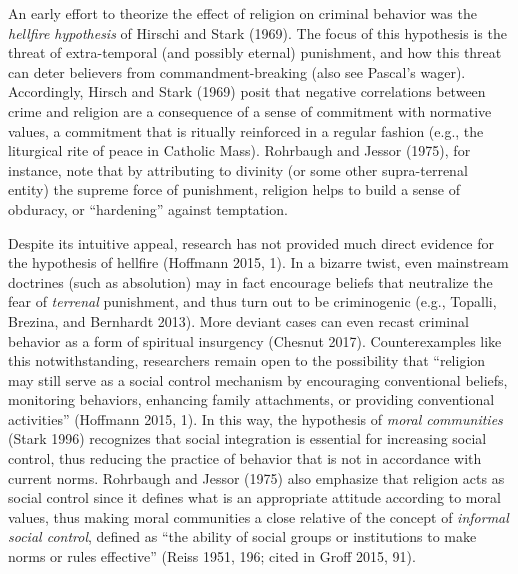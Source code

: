 \documentclass[smallextended]{svjour3}       %
\begin{document}
An early effort to theorize the effect of religion on criminal behavior
was the \emph{hellfire hypothesis} of Hirschi and Stark (1969). The
focus of this hypothesis is the threat of extra-temporal (and possibly
eternal) punishment, and how this threat can deter believers from
commandment-breaking (also see Pascal's wager). Accordingly, Hirsch and
Stark (1969) posit that negative correlations between crime and religion
are a consequence of a sense of commitment with normative values, a
commitment that is ritually reinforced in a regular fashion (e.g., the
liturgical rite of peace in Catholic Mass). Rohrbaugh and Jessor (1975),
for instance, note that by attributing to divinity (or some other
supra-terrenal entity) the supreme force of punishment, religion helps
to build a sense of obduracy, or ``hardening'' against temptation.

Despite its intuitive appeal, research has not provided much direct
evidence for the hypothesis of hellfire (Hoffmann 2015, 1). In a bizarre
twist, even mainstream doctrines (such as absolution) may in fact
encourage beliefs that neutralize the fear of \emph{terrenal}
punishment, and thus turn out to be criminogenic (e.g., Topalli,
Brezina, and Bernhardt 2013). More deviant cases can even recast
criminal behavior as a form of spiritual insurgency (Chesnut 2017).
Counterexamples like this notwithstanding, researchers remain open to
the possibility that ``religion may still serve as a social control
mechanism by encouraging conventional beliefs, monitoring behaviors,
enhancing family attachments, or providing conventional activities''
(Hoffmann 2015, 1). In this way, the hypothesis of \emph{moral
communities} (Stark 1996) recognizes that social integration is
essential for increasing social control, thus reducing the practice of
behavior that is not in accordance with current norms. Rohrbaugh and
Jessor (1975) also emphasize that religion acts as social control since
it defines what is an appropriate attitude according to moral values,
thus making moral communities a close relative of the concept of
\emph{informal social control}, defined as ``the ability of social
groups or institutions to make norms or rules effective'' (Reiss 1951,
196; cited in Groff 2015, 91).
\end{document}
